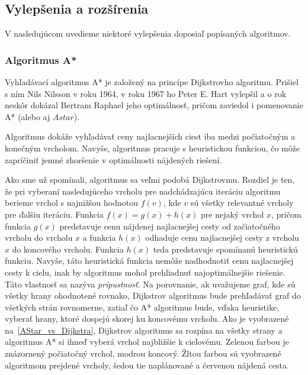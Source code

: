 \subsection{Vylepšenia a rozšírenia}

V nasledujúcom uvedieme niektoré vylepšenia doposiaľ popísaných algoritmov.


\subsubsection{Algoritmus A*}

Vyhľadávací algoritmus A* je založený na princípe Dijkstrovho algoritmu. Prišiel s ním Nils Nilsson v roku 1964, v roku 1967 ho Peter E. Hart vylepšil a o rok neskôr dokázal Bertram Raphael jeho optimálnosť, pričom zaviedol i pomenovanie A* (alebo aj $A star$).\newline

Algoritmus dokáže vyhľadávať ceny najlacnejších ciest iba medzi počiatočným a konečným vrcholom. Navyše, algoritmus pracuje s heuristickou funkciou, čo môže zapríčiniť jemné zhoršenie v optimálnosti nájdených riešení.\newline

Ako sme už spomínali, algoritmus sa veľmi podobá Dijkstrovmu. Rozdiel je ten, že pri vyberaní nasledujúceho vrcholu pre nadchádzajúcu iteráciu algoritmu berieme vrchol s najnižšou hodnotou $f(v)$, kde $v$ sú všetky relevantné vrcholy pre ďalšiu iteráciu. Funkcia $f(x) = g(x) + h(x)$ pre nejaký vrchol $x$, pričom funkcia $g(x)$ predstavuje cenu nájdenej najlacnejšej cesty od začiatočného vrcholu do vrcholu $x$ a funkcia $h(x)$ odhaduje cenu najlacnejšej cesty z vrcholu $x$ do koncového vrcholu. Funkcia $h(x)$ teda predstavuje spomínanú heuristickú funkciu. Navyše, táto heuristická funkcia nemôže nadhodnotiť cenu najlacnejšej cesty k cielu, inak by algoritmus mohol prehliadnuť najoptimálnejšie riešenie. Táto vlastnosť sa nazýva \textit{prípustnosť}. Na porovnanie, ak uvažujeme graf, kde sú všetky hrany ohodnotené rovnako, Dijkstrov algoritmus bude prehľadávať graf do všetkých strán rovnomerne, zatiaľ čo A* algoritmus bude, vďaka heuristike, vyberať hrany, ktoré dospejú skorej ku koncovému vrcholu. Ako je vyobrazené na~\ref{AStar_vs_Dijkstra}, Dijkstrov algoritmus sa rozpína na všetky strany a algoritmus A* si ihneď vyberá vrchol najbližšie k cieľovému. Zelenou farbou je znázornený počiatočný vrchol, modrou koncový. Žltou farbou sú vyobrazené algoritmom prejdené vrcholy, šedou tie naplánované a červenou nájdená cesta.\newline


